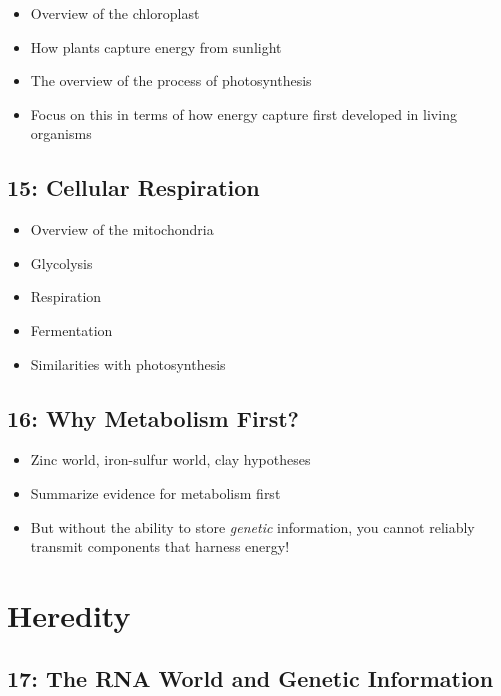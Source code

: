 \documentclass[
]{report}
\providecommand{\tightlist}{%
  \setlength{\itemsep}{0pt}\setlength{\parskip}{0pt}}
\providecommand{\tightlist}{%
  \setlength{\itemsep}{0pt}\setlength{\parskip}{0pt}}
\begin{document}
\begin{itemize}
\tightlist
\item
  Overview of the chloroplast
\item
  How plants capture energy from sunlight
\item
  The overview of the process of photosynthesis
\item
  Focus on this in terms of how energy capture first developed in living organisms
\end{itemize}

\hypertarget{cellular-respiration}{%
\section*{15: Cellular Respiration}\label{cellular-respiration}}

\begin{itemize}
\tightlist
\item
  Overview of the mitochondria
\item
  Glycolysis
\item
  Respiration
\item
  Fermentation
\item
  Similarities with photosynthesis
\end{itemize}

\hypertarget{why-metabolism-first}{%
\section*{16: Why Metabolism First?}\label{why-metabolism-first}}

\begin{itemize}
\tightlist
\item
  Zinc world, iron-sulfur world, clay hypotheses
\item
  Summarize evidence for metabolism first
\item
  But without the ability to store \emph{genetic} information, you cannot reliably transmit components that harness energy!
\end{itemize}

\hypertarget{heredity}{%
\chapter{Heredity}\label{heredity}}

\hypertarget{the-rna-world-and-genetic-information}{%
\section*{17: The RNA World and Genetic Information}\label{the-rna-world-and-genetic-information}}
\end{document}
